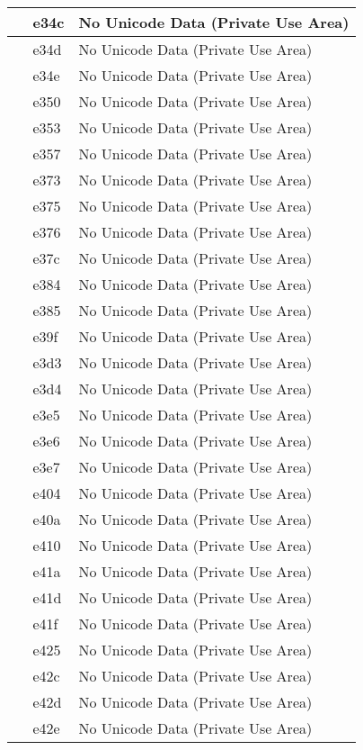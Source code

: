 \documentclass[12pt,letterpaper,openany]{book}
\begin{document}
\begin{center}
\begin{supertabular}{|m{0.25in}|m{0.5in}|m{4in}|}
 & e34c & No Unicode Data (Private Use Area)\\\hline
 & e34d & No Unicode Data (Private Use Area)\\\hline
 & e34e & No Unicode Data (Private Use Area)\\\hline
 & e350 & No Unicode Data (Private Use Area)\\\hline
 & e353 & No Unicode Data (Private Use Area)\\\hline
 & e357 & No Unicode Data (Private Use Area)\\\hline
 & e373 & No Unicode Data (Private Use Area)\\\hline
 & e375 & No Unicode Data (Private Use Area)\\\hline
 & e376 & No Unicode Data (Private Use Area)\\\hline
 & e37c & No Unicode Data (Private Use Area)\\\hline
 & e384 & No Unicode Data (Private Use Area)\\\hline
 & e385 & No Unicode Data (Private Use Area)\\\hline
 & e39f & No Unicode Data (Private Use Area)\\\hline
 & e3d3 & No Unicode Data (Private Use Area)\\\hline
 & e3d4 & No Unicode Data (Private Use Area)\\\hline
 & e3e5 & No Unicode Data (Private Use Area)\\\hline
 & e3e6 & No Unicode Data (Private Use Area)\\\hline
 & e3e7 & No Unicode Data (Private Use Area)\\\hline
 & e404 & No Unicode Data (Private Use Area)\\\hline
 & e40a & No Unicode Data (Private Use Area)\\\hline
 & e410 & No Unicode Data (Private Use Area)\\\hline
 & e41a & No Unicode Data (Private Use Area)\\\hline
 & e41d & No Unicode Data (Private Use Area)\\\hline
 & e41f & No Unicode Data (Private Use Area)\\\hline
 & e425 & No Unicode Data (Private Use Area)\\\hline
 & e42c & No Unicode Data (Private Use Area)\\\hline
 & e42d & No Unicode Data (Private Use Area)\\\hline
 & e42e & No Unicode Data (Private Use Area)\\\hline

\end{supertabular}
\end{center}
\end{document}
